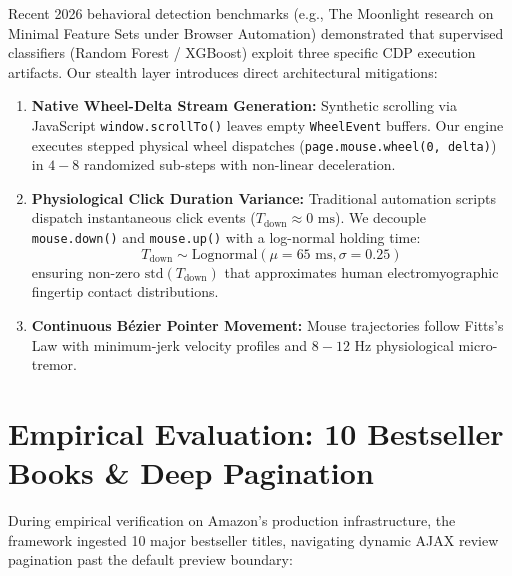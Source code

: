 \documentclass[11pt,a4paper]{article}
\begin{document}
Recent 2026 behavioral detection benchmarks (e.g., The Moonlight research on Minimal Feature Sets under Browser Automation) demonstrated that supervised classifiers (Random Forest / XGBoost) exploit three specific CDP execution artifacts. Our stealth layer introduces direct architectural mitigations:

\begin{enumerate}
    \item \textbf{Native Wheel-Delta Stream Generation:} Synthetic scrolling via JavaScript \texttt{window.scrollTo()} leaves empty \texttt{WheelEvent} buffers. Our engine executes stepped physical wheel dispatches (\texttt{page.mouse.wheel(0, delta)}) in $4-8$ randomized sub-steps with non-linear deceleration.
    \item \textbf{Physiological Click Duration Variance:} Traditional automation scripts dispatch instantaneous click events ($T_{\text{down}} \approx 0\text{ ms}$). We decouple \texttt{mouse.down()} and \texttt{mouse.up()} with a log-normal holding time:
    \begin{equation}
    T_{\text{down}} \sim \text{Lognormal}(\mu = 65\text{ ms}, \sigma = 0.25)
    \end{equation}
    ensuring non-zero $\text{std}(T_{\text{down}})$ that approximates human electromyographic fingertip contact distributions.
    \item \textbf{Continuous Bézier Pointer Movement:} Mouse trajectories follow Fitts's Law with minimum-jerk velocity profiles and $8-12\text{ Hz}$ physiological micro-tremor.
\end{enumerate}

\section{Empirical Evaluation: 10 Bestseller Books \& Deep Pagination}

During empirical verification on Amazon's production infrastructure, the framework ingested 10 major bestseller titles, navigating dynamic AJAX review pagination past the default preview boundary:
\end{document}
